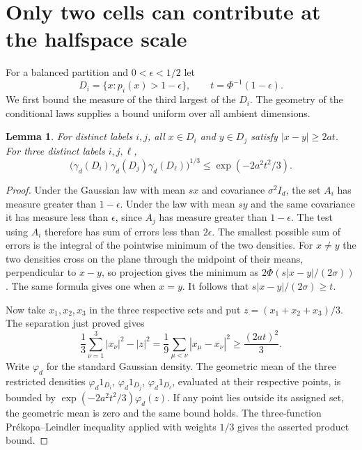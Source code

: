 \documentclass[11pt,reqno]{amsart}
\newtheorem{lemma}[theorem]{Lemma}
\newcommand{\ga}{\gamma}
\newcommand{\Phib}{\overline{\Phi}}
\begin{document}
\section{Only two cells can contribute at the halfspace scale}

For a balanced partition and $0<\epsilon<1/2$ let
\[
 D_i=\{x:p_i(x)>1-\epsilon\},\qquad t=\Phi^{-1}(1-\epsilon).
\]
We first bound the measure of the third largest of the $D_i$.
The geometry of the conditional laws supplies a bound uniform
over all ambient dimensions.

\begin{lemma}\label{lem:separation}
For distinct labels $i,j$, all $x\in D_i$ and $y\in D_j$ satisfy
$|x-y|\ge2at$. For three distinct labels $i,j,\ell$,
\[
 \big(\ga_d(D_i)\ga_d(D_j)\ga_d(D_\ell)\big)^{1/3}
 \le \exp(-2a^2t^2/3).
\]
\end{lemma}

\begin{proof}
Under the Gaussian law with mean $sx$ and covariance $\sigma^2 I_d$,
the set $A_i$ has measure greater than $1-\epsilon$. Under the law
with mean $sy$ and the same covariance it has measure less than
$\epsilon$, since $A_j$ has measure greater than $1-\epsilon$.
The test using $A_i$ therefore has sum of errors less than $2\epsilon$.
The smallest possible sum of errors is the integral of the pointwise
minimum of the two densities. For $x\ne y$ the two densities cross on
the plane through the midpoint of their means, perpendicular to
$x-y$, so projection gives the minimum as
$2\Phib(s|x-y|/(2\sigma))$. The same formula gives one when $x=y$.
It follows that $s|x-y|/(2\sigma)\ge t$.

Now take $x_1,x_2,x_3$ in the three respective sets and put
$z=(x_1+x_2+x_3)/3$. The separation just proved gives
\[
 \frac13\sum_{\nu=1}^3 |x_\nu|^2-|z|^2
 =\frac19\sum_{\mu<\nu}|x_\mu-x_\nu|^2
 \ge \frac{(2at)^2}{3}.
\]
Write $\varphi_d$ for the standard Gaussian density. The geometric
mean of the three restricted densities
$\varphi_d 1_{D_i}$, $\varphi_d 1_{D_j}$, $\varphi_d 1_{D_\ell}$,
evaluated at their respective points, is bounded by
$\exp(-2a^2t^2/3)\varphi_d(z)$. If any point lies outside its
assigned set, the geometric mean is zero and the same bound holds.
The three-function Pr\'ekopa--Leindler inequality
\cite[Theorem~3]{Prekopa} applied with weights $1/3$ gives the
asserted product bound.
\end{proof}
\end{document}
